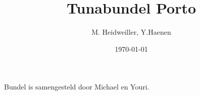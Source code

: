 \documentclass[10pt,a4paper,twoside]{article}
\title{Tunabundel Porto}
\author{M. Heidweiller,  Y.Haenen}
\date{\today}
\begin{document}
\noindent




\renewcommand\contentsname{List of awesomeness.}
\tableofcontents
\vfill
Bundel is samengesteld door Michael en Youri.
\clearpage

\raggedright
%
%
%
%
% 
%
%
%

%
%
%
%
%
%
%
%
%
%
%
%

%
%

%
%
%
%
%
%

\end{document}
